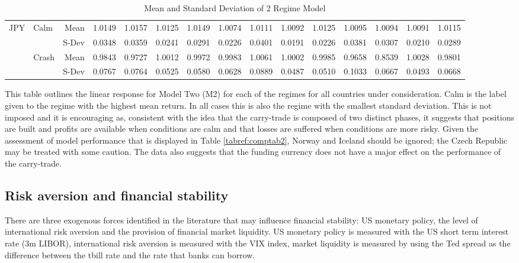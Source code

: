\documentclass[12pt, a4paper, oneside]{article} %
\begin{document}
\begin{landscape}
\begin{table}[ht]
\begin{threeparttable}
\begin{tabular}{llrrrrrrrrrrrrr}
\hline  
  \multirow{4}{*}{JPY}&\multirow{2}{*}{Calm}& Mean& 1.0149 & 1.0157 & 1.0125 & 1.0149 & 1.0074 & 1.0111 & 1.0092 & 1.0125 & 1.0095 & 1.0094 & 1.0091 & 1.0115 \\ 
 & & S-Dev &0.0348 & 0.0359 & 0.0241 & 0.0291 & 0.0226 & 0.0401 & 0.0191 & 0.0226 & 0.0381 & 0.0307 & 0.0210 & 0.0289 \\ 
  & \multirow{2}{*}{Crash}&Mean & 0.9843 & 0.9727 & 1.0012 & 0.9972 & 0.9983 & 1.0061 & 1.0002 & 0.9985 & 0.9658 & 0.8539 & 1.0028 & 0.9801 \\ 
  & & S-Dev& 0.0767 & 0.0764 & 0.0525 & 0.0580 & 0.0628 & 0.0889 & 0.0487 & 0.0510 & 0.1033 & 0.0667 & 0.0493 & 0.0668 \\ 
   \hline
\end{tabular}
\begin{tablenotes}
\small
\item
This table outlines the linear response for Model Two (M2) for each of the regimes for all countries under consideration.  Calm is the label given to the regime with the highest mean return.  In all cases this is also the regime with the smallest standard deviation. This is not imposed and it is encouraging as, consistent with the idea that the carry-trade is composed of two distinct phases, it suggests that positions are built and profits are available when conditions are calm and that losses are suffered when conditions are more risky.  Given the assessment of model performance that is displayed in Table \ref{tabref:comptab2}, Norway and Iceland should be ignored; the Czech Republic may be treated with some caution.  The data also suggests that the funding currency does not have a major effect on the performance of the carry-trade.   
\end{tablenotes}
\caption{Mean and Standard Deviation of 2 Regime Model}
\label{tabref:2stateresponse}
\end{threeparttable}
\end{table}
\end{landscape}

\subsection{Risk aversion and financial stability}
There are three exogenous forces identified in the literature that may influence financial stability:  US monetary policy, the level of international risk aversion and the provision of financial market liquidity.  US monetary policy is measured with the US short term interest rate (3m LIBOR),  international risk aversion is measured with the VIX index, market liquidity is measured by using the Ted spread as the difference between the tbill rate and the rate that banks can borrow.   
\end{document}

